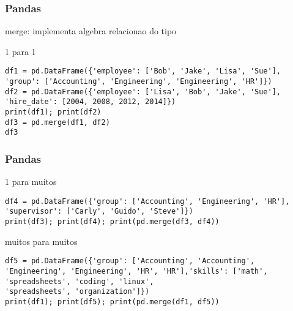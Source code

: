 \documentclass[aspectratio=169]{beamer} %
\begin{document}
\begin{frame}[fragile] \frametitle{Pandas}
merge: implementa algebra relacionao do tipo

\begin{itemize}
\end{itemize}

1 para 1
\begin{verbatim}
df1 = pd.DataFrame({'employee': ['Bob', 'Jake', 'Lisa', 'Sue'],
'group': ['Accounting', 'Engineering', 'Engineering', 'HR']})
df2 = pd.DataFrame({'employee': ['Lisa', 'Bob', 'Jake', 'Sue'],
'hire_date': [2004, 2008, 2012, 2014]})
print(df1); print(df2)
df3 = pd.merge(df1, df2)
df3
\end{verbatim}

\end{frame}

\begin{frame}[fragile] \frametitle{Pandas}

1 para muitos
\begin{verbatim}
df4 = pd.DataFrame({'group': ['Accounting', 'Engineering', 'HR'],
'supervisor': ['Carly', 'Guido', 'Steve']})
print(df3); print(df4); print(pd.merge(df3, df4))
\end{verbatim}

muitos para muitos
\begin{verbatim}
df5 = pd.DataFrame({'group': ['Accounting', 'Accounting',
'Engineering', 'Engineering', 'HR', 'HR'],'skills': ['math', 'spreadsheets', 'coding', 'linux',
'spreadsheets', 'organization']})
print(df1); print(df5); print(pd.merge(df1, df5))
\end{verbatim}

\end{frame}

\end{document}
